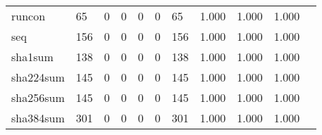 \begin{longtable}{lp{1.2cm}p{1.2cm}p{1.2cm}p{1.2cm}p{1.2cm}p{1.2cm}p{1.2cm}p{1.2cm}p{1.2cm}p{1.2cm}}
runcon    &                                    65 &                                                  0 &                                                  0 &                                                  0 &                                                  0 &                                                 65 &                                         1.000 &                                              1.000 &                                              1.000 \\
seq       &                                   156 &                                                  0 &                                                  0 &                                                  0 &                                                  0 &                                                156 &                                         1.000 &                                              1.000 &                                              1.000 \\
sha1sum   &                                   138 &                                                  0 &                                                  0 &                                                  0 &                                                  0 &                                                138 &                                         1.000 &                                              1.000 &                                              1.000 \\
sha224sum &                                   145 &                                                  0 &                                                  0 &                                                  0 &                                                  0 &                                                145 &                                         1.000 &                                              1.000 &                                              1.000 \\
sha256sum &                                   145 &                                                  0 &                                                  0 &                                                  0 &                                                  0 &                                                145 &                                         1.000 &                                              1.000 &                                              1.000 \\
sha384sum &                                   301 &                                                  0 &                                                  0 &                                                  0 &                                                  0 &                                                301 &                                         1.000 &                                              1.000 &                                              1.000 \\

\end{longtable}
